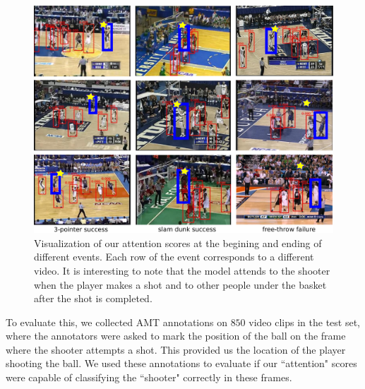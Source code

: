 

\begin{figure}[t!]
\begin{center}
   \includegraphics[width=1.0\linewidth]{images/visual_examples_v2.pdf}
\end{center}
   \caption{Visualization of our attention scores at the begining and ending of different events.
Each row of the event corresponds to a different video. It is interesting to note that the model
attends to the shooter when the player makes a shot and to other people under the basket after
the shot is completed.}
\label{fig:visual_attention}
\end{figure}

To evaluate this, 
we collected AMT annotations on $850$ video clips in the test
set, where the annotators were asked to mark the position of the ball
on the frame where the shooter attempts a shot.
This provided us the location of the player shooting the ball.
We used these annotations to evaluate if our ``attention" scores
were capable of classifying the ``shooter" correctly in these frames.

